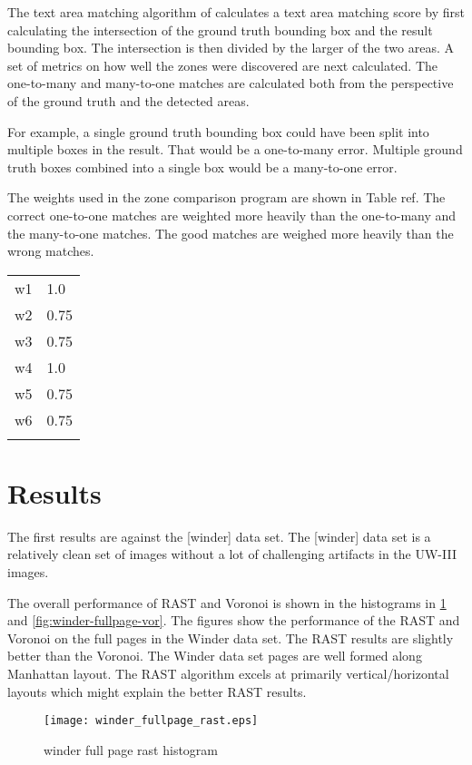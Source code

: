 \documentclass[conference]{IEEEtran}
\begin{document}
The text area matching algorithm of \cite{IEEEhowto:Philips} calculates a
text area matching score by first calculating the intersection of the ground
truth bounding box and the result bounding box. The intersection is
then divided by the larger of the two areas. A set of metrics on how well the
zones were discovered are next calculated.  The one-to-many and many-to-one
matches are calculated both from the perspective of the ground truth and the
detected areas. 

For example, a single ground truth bounding box could have been split into
multiple boxes in the result. That would be a one-to-many error. Multiple
ground truth boxes combined into a single box would be a many-to-one error.

The weights used in the zone comparison program are shown in Table ref. The
correct one-to-one matches are weighted more heavily than the one-to-many and
the many-to-one matches. The good matches are weighed more heavily than the
wrong matches.

\begin{tabular}{|r|l|}
\hline
    w1 & 1.0  \\
    w2 & 0.75 \\
    w3 & 0.75 \\
    w4 & 1.0  \\
    w5 & 0.75 \\
    w6 & 0.75 \\
\hline
\label{table:table-weights}
\end{tabular}

\section{Results}
The first results are against the [winder] data set. The [winder] data set is a
relatively clean set of images without a lot of challenging artifacts in the
UW-III images.

The overall performance of RAST and Voronoi is shown in the histograms in
\ref{fig:winder-fullpage-rast} and \ref{fig:winder-fullpage-vor}. The figures
show the performance of the RAST and Voronoi on the full pages in the Winder
data set. The RAST results are slightly better than the Voronoi. The Winder
data set pages are well formed along Manhattan layout. The RAST algorithm
excels at primarily vertical/horizontal layouts which might explain the better
RAST results.

\begin{figure}[winder-fullpage-rast]
\texttt{[image: winder\_fullpage\_rast.eps]}
\caption{winder full page rast histogram}
\label{fig:winder-fullpage-rast}
\end{figure}
\end{document}
